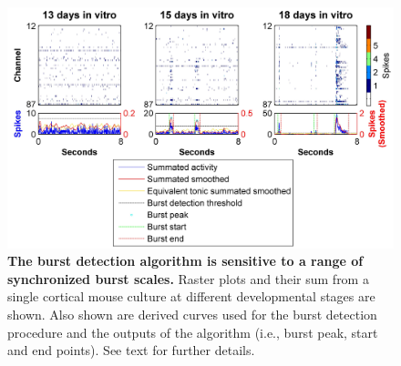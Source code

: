 \label{sec:methods:burstDetection}
\begin{figure}[!htb]
            \centering
            \includegraphics[width=15cm]{chapter2/figures/burstDetection/burstDetExample.jpg}
            \caption[Examples of burst detection output]{\textbf{The burst detection algorithm is sensitive to a range of synchronized burst scales.} Raster plots and their sum from a single cortical mouse culture at different developmental stages are shown. Also shown are derived curves used for the burst detection procedure and the outputs of the algorithm (i.e., burst peak, start and end points). See text for further details.}
            \label{fig:methods:burstDet}

          \end{figure}

